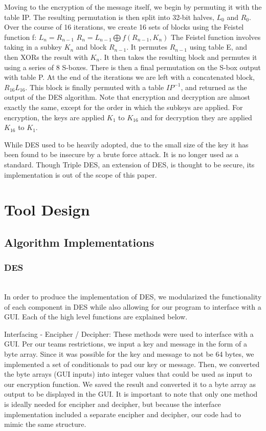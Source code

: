 \documentclass[acmlarge]{acmart}
\begin{document}
Moving to the encryption of the message itself, we begin by permuting it with the table IP. The resulting permutation is then split into 32-bit halves, $L_{0}$ and $R_{0}$. Over the course of 16 iterations, we create 16  sets of blocks using the Feistel function f:
$L_{n} = R_{n-1}$
$R_{n} = L_{n-1} \bigoplus f(R_{n-1}, K_{n})$ 
	The Feistel function involves taking in a subkey $K_{n}$ and block $R_{n - 1}$. It permutes $R_{n - 1}$ using table E, and then XORs the result with $K_{n}$. It then takes the resulting block and permutes it using a series of 8 S-boxes. There is then a final permutation on the S-box output with table P. At the end of the iterations we are left with a concatenated block, $R_{16}L_{16}$. This block is finally permuted with a table $IP^{-1}$, and returned as the output of the DES algorithm. Note that encryption and decryption are almost exactly the same, except for the order in which the subkeys are applied. For encryption, the keys are applied $K_{1}$ to $K_{16}$ and for decryption they are applied $K_{16}$ to $K_{1}$.

While DES used to be heavily adopted, due to the small size of the key it has been found to be insecure by a brute force attack. It is no longer used as a standard. Though Triple DES, an extension of DES, is thought to be secure, its implementation is out of the scope of this paper. 


\section{Tool Design} \label{sec:impl}
\subsection{Algorithm Implementations} \label{sec:algorithms}
\subsubsection{DES}
\hspace*{\fill} \\ %
In order to produce the implementation of DES, we modularized the functionality of each component in DES while also allowing for our program to interface with a GUI. Each of the high level functions are explained below. 

Interfacing - Encipher / Decipher: These methods were used to interface with a GUI. Per our teams restrictions, we input a key and message in the form of a byte array. Since it was possible for the key and message to not be 64 bytes, we implemented a set of conditionals to pad our key or message. Then, we converted the byte arrays (GUI inputs) into integer values that could be used as input to our encryption function. We saved the result and converted it to a byte array as output to be displayed in the GUI. It is important to note that only one method is ideally needed for encipher and decipher, but because the interface implementation included a separate encipher and decipher, our code had to mimic the same structure. 
\end{document}
